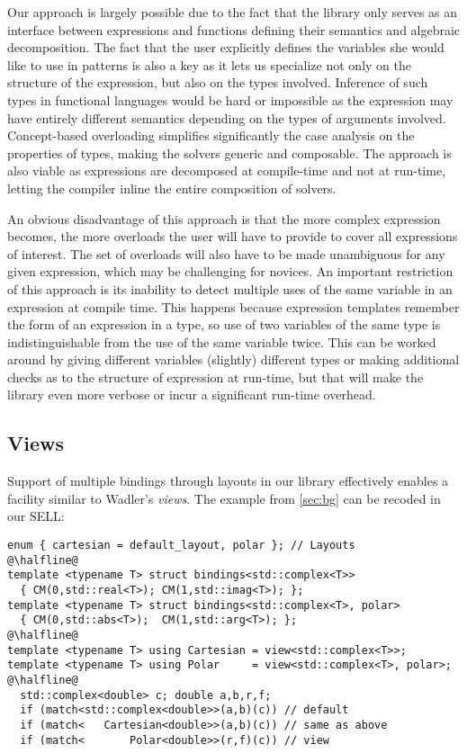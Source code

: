 \documentclass{llncs}
\begin{document}
Our approach is largely possible due to the fact that the library only serves as 
an interface between expressions and functions defining their semantics and 
algebraic decomposition. The fact that the user explicitly defines the variables 
she would like to use in patterns is also a key as it lets us specialize not 
only on the structure of the expression, but also on the types involved. 
Inference of such types in functional languages would be hard or impossible as the 
expression may have entirely different semantics depending on the types of 
arguments involved. Concept-based overloading simplifies significantly the case 
analysis on the properties of types, making the solvers generic and composable.
The approach is also viable as expressions are decomposed at compile-time and 
not at run-time, letting the compiler inline the entire composition of solvers. 

An obvious disadvantage of this approach is that the more complex expression 
becomes, the more overloads the user will have to provide to cover all 
expressions of interest. The set of overloads will also have to be made 
unambiguous for any given expression, which may be challenging for novices. An 
important restriction of this approach is its inability to detect multiple uses 
of the same variable in an expression at compile time. This happens because 
expression templates remember the form of an expression in a type, so use of two 
variables of the same type is indistinguishable from the use of the same 
variable twice. This can be worked around by giving different variables 
(slightly) different types or making additional checks as to the structure of 
expression at run-time, but that will make the library even more verbose or 
incur a significant run-time overhead.

\subsection{Views}
\label{sec:view}

Support of multiple bindings through layouts in our library effectively enables 
a facility similar to Wadler's \emph{views}\cite{Wadler87}. The example from 
\textsection\ref{sec:bg} can be recoded in our SELL:

\begin{lstlisting}[keepspaces,columns=flexible]
enum { cartesian = default_layout, polar }; // Layouts
@\halfline@
template <typename T> struct bindings<std::complex<T>>
  { CM(0,std::real<T>); CM(1,std::imag<T>); };
template <typename T> struct bindings<std::complex<T>, polar>
  { CM(0,std::abs<T>);  CM(1,std::arg<T>); };
@\halfline@
template <typename T> using Cartesian = view<std::complex<T>>;
template <typename T> using Polar     = view<std::complex<T>, polar>;
@\halfline@
  std::complex<double> c; double a,b,r,f;
  if (match<std::complex<double>>(a,b)(c)) // default
  if (match<   Cartesian<double>>(a,b)(c)) // same as above
  if (match<       Polar<double>>(r,f)(c)) // view
\end{lstlisting}
\end{document}
